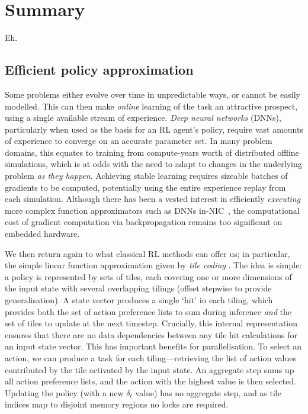 \section{Summary}
Eh.

\subsection{Efficient policy approximation}
Some problems either evolve over time in unpredictable ways, or cannot be easily modelled.
This can then make \emph{online} learning of the task an attractive prospect, using a single available stream of experience.
\emph{Deep neural networks} (DNNs), particularly when used as the basis for an RL agent's policy, require vast amounts of experience to converge on an accurate parameter set.
In many problem domains, this equates to training from compute-years worth of distributed offline simulations, which is at odds with the need to adapt to changes in the underlying problem \emph{as they happen}.
Achieving stable learning requires sizeable batches of gradients to be computed, potentially using the entire experience replay from each simulation.
Although there has been a vested interest in efficiently \emph{executing} more complex function approximators such as DNNs in-NIC~\parencite{DBLP:journals/corr/abs-2002-08987,DBLP:journals/corr/abs-2009-02353,DBLP:conf/sigcomm/SanvitoSB18,DBLP:journals/corr/abs-1801-05731,langlet-ml-netronome}, the computational cost of gradient computation via backpropagation remains too significant on embedded hardware.


We then return again to what classical RL methods can offer us; in particular, the simple linear function approximation given by \emph{tile coding} \cite[pp.\ \numrange{217}{221}]{RL2E}.
The idea is simple: a policy is represented by sets of tiles, each covering one or more dimensions of the input state with several overlapping tilings (offset stepwise to provide generalisation).
A state vector produces a single `hit' in each tiling, which provides both the set of action preference lists to sum during inference \emph{and} the set of tiles to update at the next timestep.
Crucially, this internal representation ensures that there are no data dependencies between any tile hit calculations for an input state vector.
This has important benefits for parallelisation.
To select an action, we can produce a task for each tiling---retrieving the list of action values contributed by the tile activated by the input state.
An aggregate step sums up all action preference lists, and the action with the highest value is then selected.
Updating the policy (with a new $\delta_t$ value) has no aggregate step, and as tile indices map to disjoint memory regions no locks are required.

